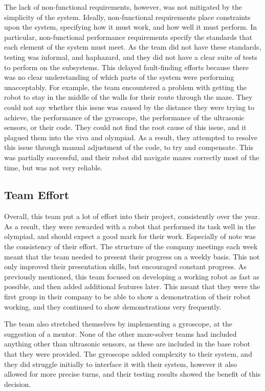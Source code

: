         The lack of non-functional requirements, however, was not mitigated by the simplicity of the system.
        Ideally, non-functional requirements place constraints upon the system, specifying how it must work, and how well it must perform.
        In particular, non-functional performance requirements specify the standards that each element of the system must meet.
        As the team did not have these standards, testing was informal, and haphazard, and they did not have a clear suite of tests to perform on the subsystems.
        This delayed fault-finding efforts because there was no clear understanding of which parts of the system were performing unacceptably.
        For example, the team encountered a problem with getting the robot to stay in the middle of the walls for their route through the maze.
        They could not say whether this issue was caused by the distance they were trying to achieve, the performance of the gyroscope, the performance of the ultrasonic sensors, or their code.
        They could not find the root cause of this issue, and it plagued them into the viva and olympiad.
        As a result, they attempted to resolve this issue through manual adjustment of the code, to try and compensate.
        This was partially successful, and their robot did navigate mazes correctly most of the time, but was not very reliable.

    \subsection{Team Effort}\label{subsec:technical-effort}
        Overall, this team put a lot of effort into their project, consistently over the year.
        As a result, they were rewarded with a robot that performed its task well in the olympiad, and should expect a good mark for their work.
        Especially of note was the consistency of their effort.
        The structure of the company meetings each week meant that the team needed to present their progress on a weekly basis.
        This not only improved their presentation skills, but encouraged constant progress.
        As previously mentioned, this team focused on developing a working robot as fast as possible, and then added additional features later.
        This meant that they were the first group in their company to be able to show a demonstration of their robot working, and they continued to show demonstrations very frequently.

        The team also stretched themselves by implementing a gyroscope, at the suggestion of a mentor.
        None of the other maze-solver teams had included anything other than ultrasonic sensors, as these are included in the base robot that they were provided.
        The gyroscope added complexity to their system, and they did struggle initially to interface it with their system, however it also allowed for more precise turns, and their testing results showed the benefit of this decision.

